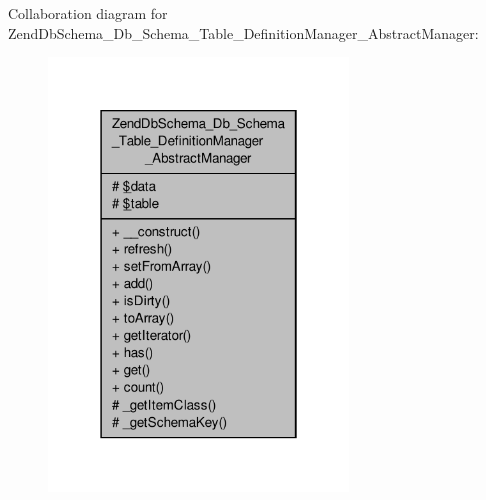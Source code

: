 Collaboration diagram for Zend\-Db\-Schema\-\_\-\-Db\-\_\-\-Schema\-\_\-\-Table\-\_\-\-Definition\-Manager\-\_\-\-Abstract\-Manager\-:\nopagebreak
\begin{figure}[H]
\begin{center}
\leavevmode
\includegraphics[width=226pt]{classZendDbSchema__Db__Schema__Table__DefinitionManager__AbstractManager__coll__graph}
\end{center}
\end{figure}
